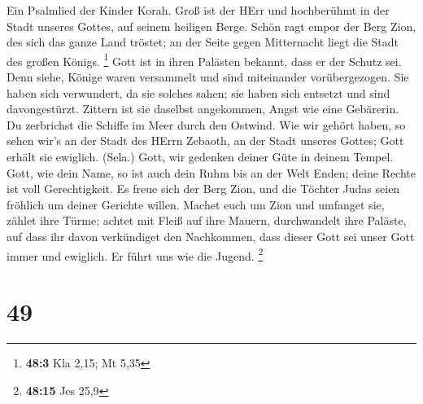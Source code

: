  Ein Psalmlied der Kinder Korah.  Groß ist der
HErr und hochberühmt in der Stadt unseres Gottes, auf seinem heiligen
Berge.  Schön ragt empor der Berg Zion, des sich das ganze
Land tröstet; an der Seite gegen Mitternacht liegt die Stadt des großen
Königs. \footnote{\textbf{48:3} Kla 2,15; Mt 5,35}  Gott ist
in ihren Palästen bekannt, dass er der Schutz sei.  Denn
siehe, Könige waren versammelt und sind miteinander vorübergezogen.
 Sie haben sich verwundert, da sie solches sahen; sie haben
sich entsetzt und sind davongestürzt.  Zittern ist sie
daselbst angekommen, Angst wie eine Gebärerin.  Du
zerbrichst die Schiffe im Meer durch den Ostwind.  Wie wir
gehört haben, so sehen wir's an der Stadt des HErrn Zebaoth, an der
Stadt unseres Gottes; Gott erhält sie ewiglich. (Sela.) 
Gott, wir gedenken deiner Güte in deinem Tempel.  Gott, wie
dein Name, so ist auch dein Ruhm bis an der Welt Enden; deine Rechte ist
voll Gerechtigkeit.  Es freue sich der Berg Zion, und die
Töchter Judas seien fröhlich um deiner Gerichte willen. 
Machet euch um Zion und umfanget sie, zählet ihre Türme; 
achtet mit Fleiß auf ihre Mauern, durchwandelt ihre Paläste, auf dass
ihr davon verkündiget den Nachkommen,  dass dieser Gott sei
unser Gott immer und ewiglich. Er führt uns wie die Jugend. \footnote{\textbf{48:15}
  Jes 25,9}

\hypertarget{section-21}{%
\section{49}\label{section-21}}

